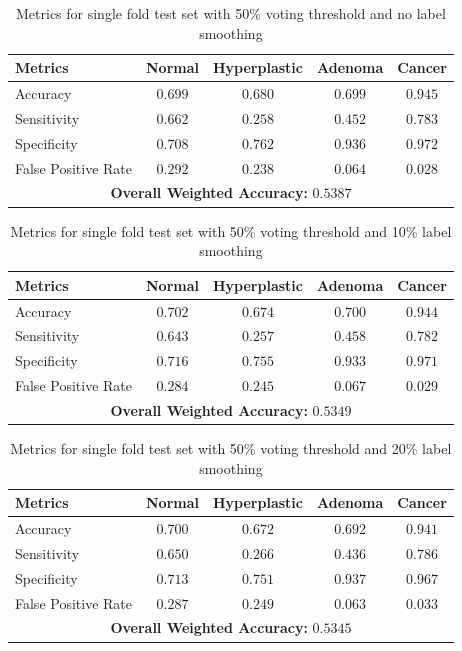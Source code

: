 \begin{table}[ht] \centering \caption{Metrics for single fold test set
with 50\% voting threshold and no label smoothing} \begin{tabular}{lcccc} \toprule Metrics & Normal & Hyperplastic & Adenoma & Cancer \\
\midrule
Accuracy & $0.699$ & $0.680$ & $0.699$ & $0.945$ \\
Sensitivity & $0.662$ & $0.258$ & $0.452$ & $0.783$ \\
Specificity & $0.708$ & $0.762$ & $0.936$ & $0.972$ \\
False Positive Rate & $0.292$ & $0.238$ & $0.064$ & $0.028$ \\
\midrule \multicolumn{5}{c}{\textbf{Overall Weighted Accuracy:} $0.5387$} \\
\bottomrule \end{tabular}
\label{tab:voting05_results} \end{table}

\begin{table}[ht] \centering \caption{Metrics for single fold test set with 50\% voting threshold and 10\% label smoothing} \begin{tabular}{lcccc} \toprule Metrics & Normal & Hyperplastic & Adenoma & Cancer \\
\midrule
Accuracy & $0.702$ & $0.674$ & $0.700$ & $0.944$ \\
Sensitivity & $0.643$ & $0.257$ & $0.458$ & $0.782$ \\
Specificity & $0.716$ & $0.755$ & $0.933$ & $0.971$ \\
False Positive Rate & $0.284$ & $0.245$ & $0.067$ & $0.029$ \\
\midrule \multicolumn{5}{c}{\textbf{Overall Weighted Accuracy:} $0.5349$} \\
\bottomrule
\end{tabular} \label{tab:ls01_results} \end{table}

\begin{table}[ht] \centering \caption{Metrics for single fold test set with 50\% voting threshold and 20\% label smoothing} \begin{tabular}{lcccc} \toprule Metrics & Normal & Hyperplastic & Adenoma & Cancer \\
\midrule
Accuracy & $0.700$ & $0.672$ & $0.692$ & $0.941$ \\
Sensitivity & $0.650$ & $0.266$ & $0.436$ & $0.786$ \\
Specificity & $0.713$ & $0.751$ & $0.937$ & $0.967$ \\
False Positive Rate & $0.287$ & $0.249$ & $0.063$ & $0.033$ \\
\midrule \multicolumn{5}{c}{\textbf{Overall Weighted Accuracy:} $0.5345$} \\
\bottomrule
\end{tabular} \label{tab:ls02_results} \end{table}


